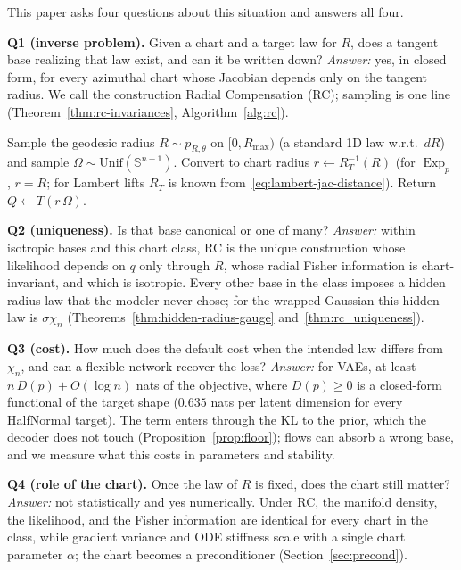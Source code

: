 \documentclass{article}
\theoremstyle{definition}
\theoremstyle{remark}
\newcommand{\SSS}{\mathbb{S}}
\newcommand{\Exp}{\operatorname{Exp}}
\begin{document}
This paper asks four questions about this situation and answers all four.

\textbf{Q1 (inverse problem).} Given a chart and a target law for $R$, does a tangent base realizing that law exist, and can it be written down? \emph{Answer:} yes, in closed form, for every azimuthal chart whose Jacobian depends only on the tangent radius. We call the construction Radial Compensation (RC); sampling is one line (Theorem~\ref{thm:rc-invariances}, Algorithm~\ref{alg:rc}).

\begin{algorithm}[H]
\caption{\textsc{SampleRC}$(p_{R,\theta},\,T)$}
\label{alg:rc}
\begin{algorithmic}[1]
\STATE Sample the geodesic radius $R\sim p_{R,\theta}$ on $[0,R_{\max})$ (a standard 1D law w.r.t.\ $dR$)
and sample $\Omega\sim\mathrm{Unif}(\SSS^{n-1})$.
\STATE Convert to chart radius $r \leftarrow R_T^{-1}(R)$ (for $\Exp_p$, $r=R$; for Lambert lifts $R_T$ is known from~\eqref{eq:lambert-jac-distance}).
\STATE Return $Q \leftarrow T(r\,\Omega)$.
\end{algorithmic}
\end{algorithm}

\textbf{Q2 (uniqueness).} Is that base canonical or one of many? \emph{Answer:} within isotropic bases and this chart class, RC is the unique construction whose likelihood depends on $q$ only through $R$, whose radial Fisher information is chart-invariant, and which is isotropic. Every other base in the class imposes a hidden radius law that the modeler never chose; for the wrapped Gaussian this hidden law is $\sigma\chi_n$ (Theorems~\ref{thm:hidden-radius-gauge} and~\ref{thm:rc_uniqueness}).

\textbf{Q3 (cost).} How much does the default cost when the intended law differs from $\chi_n$, and can a flexible network recover the loss? \emph{Answer:} for VAEs, at least $n\,D(p)+O(\log n)$ nats of the objective, where $D(p)\ge0$ is a closed-form functional of the target shape ($0.635$ nats per latent dimension for every HalfNormal target). The term enters through the KL to the prior, which the decoder does not touch (Proposition~\ref{prop:floor}); flows can absorb a wrong base, and we measure what this costs in parameters and stability.

\textbf{Q4 (role of the chart).} Once the law of $R$ is fixed, does the chart still matter? \emph{Answer:} not statistically and yes numerically. Under RC, the manifold density, the likelihood, and the Fisher information are identical for every chart in the class, while gradient variance and ODE stiffness scale with a single chart parameter $\alpha$; the chart becomes a preconditioner (Section~\ref{sec:precond}).
\end{document}
